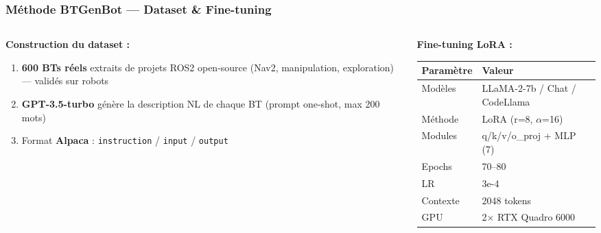 \documentclass[aspectratio=169]{beamer}
\begin{document}

\begin{frame}
  \frametitle{Méthode BTGenBot — Dataset \& Fine-tuning}

  \begin{columns}
    \begin{column}{0.48\textwidth}
      \textbf{Construction du dataset :}
      \begin{enumerate}
        \item \textbf{600 BTs réels} extraits de projets ROS2 open-source
              (Nav2, manipulation, exploration) — validés sur robots
        \item \textbf{GPT-3.5-turbo} génère la description NL de chaque BT
              (prompt one-shot, max 200 mots)
        \item Format \textbf{Alpaca} : \texttt{instruction} / \texttt{input} / \texttt{output}
      \end{enumerate}
    \end{column}
    \begin{column}{0.48\textwidth}
      \textbf{Fine-tuning LoRA :}

      {\scriptsize
      \begin{tabular}{ll}
        \toprule
        Paramètre & Valeur \\
        \midrule
        Modèles & LLaMA-2-7b / Chat / CodeLlama \\
        Méthode & LoRA (r=8, $\alpha$=16) \\
        Modules & q/k/v/o\_proj + MLP (7) \\
        Epochs & 70–80 \\
        LR & 3e-4 \\
        Contexte & 2048 tokens \\
        GPU & 2$\times$ RTX Quadro 6000 \\
        \bottomrule
      \end{tabular}}
    \end{column}
  \end{columns}
\end{frame}

\end{document}
